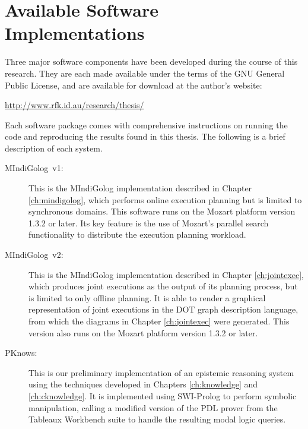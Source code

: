 

\chapter{Available Software Implementations}

\label{ch:implementation}

Three major software components have been developed during the course
of this research. They are each made available under the terms of
the GNU General Public License, and are available for download at
the author's website:

\begin{center}
\url{http://www.rfk.id.au/research/thesis/} 
\par\end{center}

Each software package comes with comprehensive instructions on running
the code and reproducing the results found in this thesis. The following
is a brief description of each system.

\begin{description}
\item [{{MIndiGolog~v1:}}] This is the MIndiGolog implementation described
in Chapter \ref{ch:mindigolog}, which performs online execution planning
but is limited to synchronous domains. This software runs on the Mozart
platform version 1.3.2 or later. Its key feature is the use of Mozart's
parallel search functionality to distribute the execution planning
workload. 
\item [{{MIndiGolog~v2:}}] This is the MIndiGolog implementation described
in Chapter \ref{ch:jointexec}, which produces joint executions as
the output of its planning process, but is limited to only offline
planning. It is able to render a graphical representation of joint
executions in the DOT graph description language, from which the diagrams
in Chapter \ref{ch:jointexec} were generated. This version also runs
on the Mozart platform version 1.3.2 or later. 
\item [{{PKnows:}}] This is our preliminary implementation of an epistemic
reasoning system using the techniques developed in Chapters \ref{ch:knowledge}
and \ref{ch:cknowledge}. It is implemented using SWI-Prolog to perform
symbolic manipulation, calling a modified version of the PDL prover
from the Tableaux Workbench suite \citep{abate07twb_desc} to handle
the resulting modal logic queries. 
\end{description}
